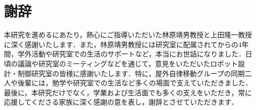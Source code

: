 \chapter*{謝辞}

本研究を進めるにあたり，熱心にご指導いただいた林原靖男教授と上田隆一教授に深く感謝いたします．また，林原靖男教授には研究室に配属されてからの4年間，学外活動や研究室での生活のサポートなど，本当にお世話になりました．日頃の議論や研究室のミーティングなどを通じて，意見をいただいたロボット設計・制御研究室の皆様に感謝いたします．特に，屋外自律移動グループの同期二人や後輩には，勉学や研究室での生活など多くの場面で支えていただきました．最後に，本研究だけでなく，学業および生活面でも多くの支えをいただき，常に応援してくださる家族に深く感謝の意を表し，謝辞とさせていただきます．
%
